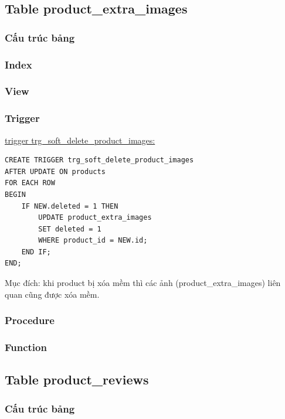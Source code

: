 \subsection{Table product\_extra\_images}

\subsubsection{Cấu trúc bảng}

\subsubsection{Index}

\subsubsection{View}

\subsubsection{Trigger}

\underline{trigger trg\_soft\_delete\_product\_images:}

\begin{verbatim}
CREATE TRIGGER trg_soft_delete_product_images
AFTER UPDATE ON products
FOR EACH ROW
BEGIN
    IF NEW.deleted = 1 THEN
        UPDATE product_extra_images
        SET deleted = 1
        WHERE product_id = NEW.id;
    END IF;
END;
\end{verbatim}

Mục đích: khi product bị xóa mềm thì các ảnh (product\_extra\_images) liên quan cũng được xóa mềm.

\subsubsection{Procedure}

\subsubsection{Function}

\subsection{Table product\_reviews}

\subsubsection{Cấu trúc bảng}


